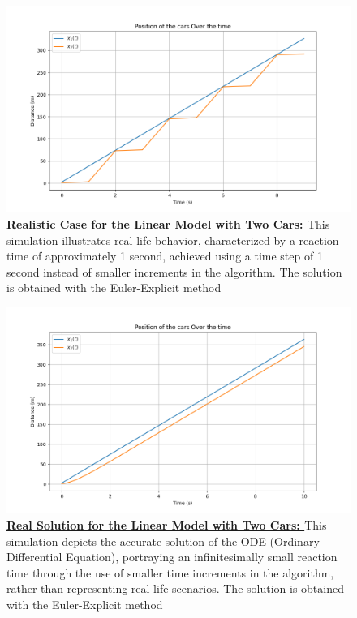 \documentclass{article}
\begin{document}
			
		
		\begin{figure}[H]
			\centering
			\includegraphics[width=0.8\linewidth]{RealisticCase.png}
			\caption[Realistic Case for the Linear Model with Two Cars]{\textbf{\underline{Realistic Case for the Linear Model with Two Cars: }}This simulation illustrates real-life behavior, characterized by a reaction time of approximately 1 second, achieved using a time step of 1 second instead of smaller increments in the algorithm. The solution is obtained with the Euler-Explicit method}
			\label{fig:RC1}
		\end{figure}
		
		\begin{figure}[H]
			\centering
			\includegraphics[width=0.8\linewidth]{RealSolCase.png}
			\caption[Real Solution for the Linear Model with Two Cars]{\textbf{\underline{Real Solution for the Linear Model with Two Cars: }}This simulation depicts the accurate solution of the ODE (Ordinary Differential Equation), portraying an infinitesimally small reaction time through the use of smaller time increments in the algorithm, rather than representing real-life scenarios. The solution is obtained with the Euler-Explicit method}
			\label{fig:RS1}
		\end{figure}
		
\end{document}
